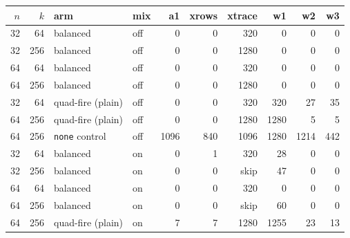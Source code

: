 \documentclass[11pt]{article}
\newcommand{\doc}[1]{\texttt{#1}}
\begin{document}
\begin{center}\small
\begin{tabular}{@{}rrllrrrrrr@{}}
\toprule
$n$ & $k$ & arm & mix & a1 & xrows & xtrace & w1 & w2 & w3 \\
\midrule
32 & 64 & balanced & off & 0 & 0 & 320 & 0 & 0 & 0 \\
32 & 256 & balanced & off & 0 & 0 & 1280 & 0 & 0 & 0 \\
64 & 64 & balanced & off & 0 & 0 & 320 & 0 & 0 & 0 \\
64 & 256 & balanced & off & 0 & 0 & 1280 & 0 & 0 & 0 \\
32 & 64 & quad-fire (plain) & off & 0 & 0 & 320 & 320 & 27 & 35 \\
64 & 256 & quad-fire (plain) & off & 0 & 0 & 1280 & 1280 & 5 & 5 \\
64 & 256 & \doc{none} control & off & 1096 & 840 & 1096 & 1280 & 1214 & 442 \\
32 & 64 & balanced & on & 0 & 1 & 320 & 28 & 0 & 0 \\
32 & 256 & balanced & on & 0 & 0 & skip & 47 & 0 & 0 \\
64 & 64 & balanced & on & 0 & 0 & 320 & 0 & 0 & 0 \\
64 & 256 & balanced & on & 0 & 0 & skip & 60 & 0 & 0 \\
64 & 256 & quad-fire (plain) & on & 7 & 7 & 1280 & 1255 & 23 & 13 \\
\bottomrule
\end{tabular}
\end{center}
\end{document}
